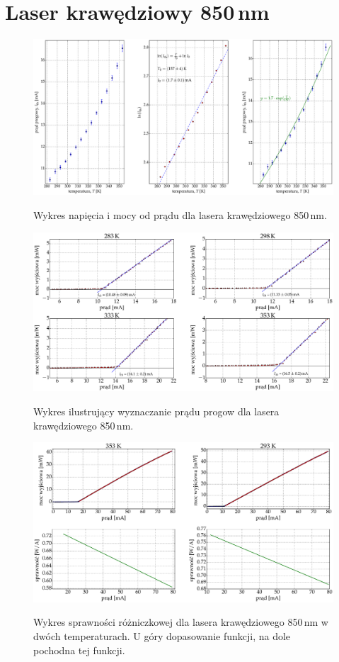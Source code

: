 \section{Laser krawędziowy 850\,nm}
\begin{figure}
\center
  \includegraphics[scale=0.30]{plot_edge_850/plot_fit.eps}
  \label{rys1}
  \caption{Wykres napięcia i mocy od prądu dla lasera krawędziowego 850\,nm.}
\end{figure}
\begin{figure}
\center
  \includegraphics[scale=0.30]{plot_edge_850/plot_i_th4.eps}
  \label{rys1}
  \caption{Wykres ilustrujący wyznaczanie prądu progow dla lasera krawędziowego 850\,nm.}
\end{figure}
\begin{figure}
\center
  \includegraphics[scale=0.30]{plot_edge_850/eff_via_current4.eps}
  \label{rys1}
  \caption{Wykres sprawności różniczkowej dla lasera krawędziowego 850\,nm w dwóch temperaturach. U góry dopasowanie funkcji,
  na dole pochodna tej funkcji.}
\end{figure}
